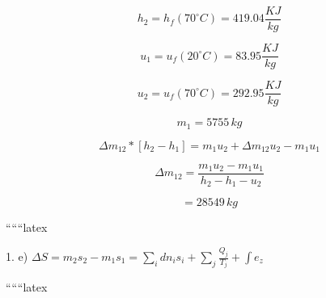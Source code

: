 \[
h_2 = h_f (70^\circ C) = 419.04 \frac{KJ}{kg}
\]

\[
u_1 = u_f (20^\circ C) = 83.95 \frac{KJ}{kg}
\]

\[
u_2 = u_f (70^\circ C) = 292.95 \frac{KJ}{kg}
\]

\[
m_1 = 5755 \, kg
\]

\[
\Delta m_{12} \ast [h_2 - h_1] = m_1 u_2 + \Delta m_{12} u_2 - m_1 u_1
\]

\[
\Delta m_{12} = \frac{m_1 u_2 - m_1 u_1}{h_2 - h_1 - u_2}
\]

\[
= 28549 \, kg
\]

``````latex


1. e) \(\Delta S = m_2 s_2 - m_1 s_1 = \sum_i dn_i s_i + \sum_j \frac{Q_j}{T_j} + \int e_z\)

``````latex


